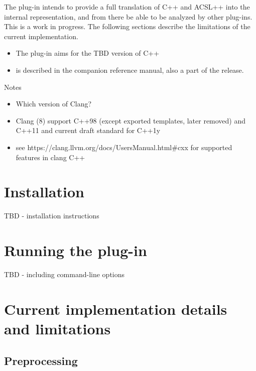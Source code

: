 The \fclang plug-in intends to provide a full translation of C++ and ACSL++ into the \framac internal representation, and from there be able to be analyzed by other \framac plug-ins. This is a work in progress. The following sections describe the  limitations of the current implementation.
\begin{itemize}
	\item The plug-in aims for the TBD version of C++
	\item \acslpp is described in the companion \acslpp reference manual, also a part of the \framac release.
\end{itemize}


Notes
\begin{itemize}
	\item Which version of Clang?
	\item Clang (8) support C++98 (except exported templates, later removed) and C++11 and current draft standard for C++1y 
	\item see https://clang.llvm.org/docs/UsersManual.html\#cxx for supported features in clang C++
\end{itemize}

\chapter{Installation}

TBD - installation instructions

\chapter{Running the plug-in}

TBD - including command-line options

\chapter{Current implementation details and limitations}

\section{Preprocessing}

